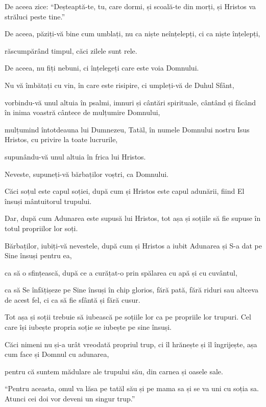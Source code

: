 {De aceea zice: “Deșteaptă-te, tu, care dormi, și scoală-te din morți, și Hristos va străluci peste tine.”


\par }{\PP {}De aceea, păziți-vă bine cum umblați, nu ca niște neînțelepți, ci ca niște înțelepți,

răscumpărând timpul, căci zilele sunt rele.

De aceea, nu fiți nebuni, ci înțelegeți care este voia Domnului.

Nu vă îmbătați cu vin, în care este risipire, ci umpleți-vă de Duhul Sfânt,

vorbindu-vă unul altuia în psalmi, imnuri și cântări spirituale, cântând și făcând în inima voastră cântece de mulțumire Domnului,

mulțumind întotdeauna lui Dumnezeu, Tatăl, în numele Domnului nostru Isus Hristos, cu privire la toate lucrurile,

supunându-vă unul altuia în frica lui Hristos.


\par }{\PP {}Neveste, supuneți-vă bărbaților voștri, ca Domnului.

Căci soțul este capul soției, după cum și Hristos este capul adunării, fiind El însuși mântuitorul trupului.

Dar, după cum Adunarea este supusă lui Hristos, tot așa și soțiile să fie supuse în totul propriilor lor soți.


\par }{\PP {}Bărbaților, iubiți-vă nevestele, după cum și Hristos a iubit Adunarea și S-a dat pe Sine însuși pentru ea,

ca să o sfințească, după ce a curățat-o prin spălarea cu apă și cu cuvântul,

ca să Se înfățișeze pe Sine însuși în chip glorios, fără pată, fără riduri sau altceva de acest fel, ci ca să fie sfântă și fără cusur.

Tot așa și soții trebuie să iubească pe soțiile lor ca pe propriile lor trupuri. Cel care își iubește propria soție se iubește pe sine însuși.

Căci nimeni nu și-a urât vreodată propriul trup, ci îl hrănește și îl îngrijește, așa cum face și Domnul cu adunarea,

pentru că suntem mădulare ale trupului său, din carnea și oasele sale.

“Pentru aceasta, omul va lăsa pe tatăl său și pe mama sa și se va uni cu soția sa. Atunci cei doi vor deveni un singur trup.”

}
